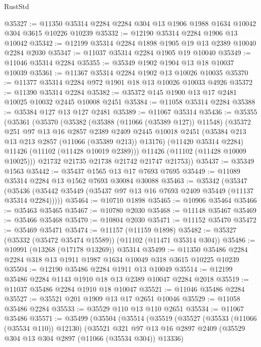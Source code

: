 \begin{lexlean}{RustStd}
\begin{coremodule}
@35327 := @11350 @35314 @2284 @2284 @304 @13 @1906 @1988 @1634 @10042 @304 @3615 @10226 @10239
@35332 := @12190 @35314 @2284 @1906 @13 @10042
@35342 := @12199 @35314 @2284 @1898 @1905 @19 @13 @2389 @10040 @2284 @2030
@35347 := @11037 @35314 @2284 @1905 @19 @10040
@35349 := @11046 @35314 @2284
@35355 := @35349 @1902 @1904 @13 @18 @10037 @10039
@35361 := @11367 @35314 @2284 @1902 @13 @10026 @10035
@35370 := @11377 @35314 @2284 @972 @1901 @18 @13 @10026 @10033 @4926
@35372 := @11390 @35314 @2284
@35382 := @35372 @145 @1900 @13 @17 @2481 @10025 @10032 @2445 @10008 @2451
@35384 := @11058 @35314 @2284
@35388 := @35384 @127 @13 @127 @2481
@35389 := @11067 @35314
@35436 := @35355
    (@35361
      (@35370
        (@35382
          (@35388 (@11066 (@35389 @127)) @11548)
          (@35372
            @251
            @97
            @13
            @16
            @2857
            @2389
            @2409
            @2445
            @10018
            @2451
            (@35384 @213 @13 @213 @2857 (@11066 (@35389 @213)) @13176)
            (@11420 @35314 @2284)
            @11426
            (@11102 (@11428 @10019 @2389)))
          @11426
          (@11102 (@11428 @10009 @10025)))
        @21732
        @21735
        @21738
        @21742
        @21747
        @21753))
@35437 := @35349 @1563
@35442 := @35437 @1565 @13 @17 @7693 @7695
@35449 := @11089 @35314 @2284 @13 @1562 @7693 @30084 @30088
@35463 := @35342
    (@35347 (@35436 (@35442 @35449 (@35437 @97 @13 @16 @7693 @2409 @35449 (@11137 @35314 @2284)))))
@35464 := @10710 @1898
@35465 := @10906 @35464
@35466 := @35463 @35465
@35467 := @10780 @2030
@35468 := @11148 @35467
@35469 := @35466 @35468
@35470 := @10804 @2030
@35471 := @11152 @35470
@35472 := @35469 @35471
@35474 := @11157 (@11159 @1898)
@35482 := @35327 (@35332 (@35472 @35474 @15589)) (@11102 (@11471 @35314 @304))
@35486 := @10991 (@13268 (@17178 @13269)) @35314
@35499 := @11350 @35486 @2284 @2284 @318 @13 @1911 @1987 @1634 @10049 @318 @3615 @10225 @10239
@35504 := @12190 @35486 @2284 @1911 @13 @10049
@35514 := @12199 @35486 @2284 @1143 @1910 @18 @13 @2389 @10047 @2284 @2018
@35519 := @11037 @35486 @2284 @1910 @18 @10047
@35521 := @11046 @35486 @2284
@35527 := @35521 @201 @1909 @13 @17 @2651 @10046
@35529 := @11058 @35486 @2284
@35533 := @35529 @110 @13 @110 @2651
@35534 := @11067 @35486
@35571 := @35499
    (@35504
      (@35514
        (@35519
          (@35527
            (@35533 (@11066 (@35534 @110)) @12130)
            (@35521
              @321
              @97
              @13
              @16
              @2897
              @2409
              (@35529 @304 @13 @304 @2897 (@11066 (@35534 @304)) @13336)

\end{coremodule}
\end{lexlean}
